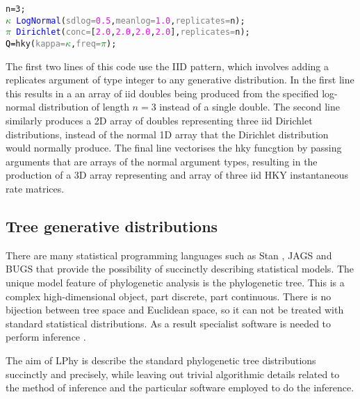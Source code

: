 \documentclass[10pt,letterpaper,table]{article}
\begin{document}
{\singlespacing
\begin{alltt}
  n = 3;
  \textcolor{green}{\(\kappa\)} ~ \textcolor{blue}{LogNormal}(\textcolor{gray}{sdlog=}\textcolor{magenta}{0.5}, \textcolor{gray}{meanlog=}\textcolor{magenta}{1.0}, \textcolor{gray}{replicates=}n);
  \textcolor{green}{\(\pi\)} ~ \textcolor{blue}{Dirichlet}(\textcolor{gray}{conc=}[\textcolor{magenta}{2.0}, \textcolor{magenta}{2.0}, \textcolor{magenta}{2.0}, \textcolor{magenta}{2.0}], \textcolor{gray}{replicates=}n);
  \textcolor{black}{Q = }\textcolor{magenta!80!black}{hky}(\textcolor{gray}{kappa=}\textcolor{green}{\(\kappa\)}, \textcolor{gray}{freq=}\textcolor{green}{\(\pi\)});

\end{alltt} 

The first two lines of this code use the IID pattern, which involves adding a replicates argument of type integer to any generative distribution. In the first line this results in a an array of iid doubles being produced from the specified log-normal distribution of length $n = 3$ instead of a single double. The second line similarly produces a 2D array of doubles representing three iid Dirichlet distributions, instead of the normal 1D array that the Dirichlet distribution would normally produce. The final line vectorises the hky funcgtion by passing arguments that are arrays of the normal argument types, resulting in the production of a 3D array representing and array of three iid HKY instantaneous rate matrices.

\subsection*{Tree generative distributions}

There are many statistical programming languages such as Stan
\cite{carpenter2017stan}, JAGS \cite{plummer2003jags} and BUGS \cite{lunn2009bugs, gilks1994language} that provide the possibility
of succinctly describing statistical models. The unique model feature of
phylogenetic analysis is the phylogenetic tree.
This is a complex high-dimensional object, part discrete, part
continuous.
There is no bijection between tree space and Euclidean space, so it
can not be treated with standard statistical distributions.
As a result specialist software is needed to perform inference \cite{hohna2016revbayes,bouckaert2019beastanalysis}.

The aim of LPhy is describe the standard phylogenetic tree
distributions succinctly and precisely, while leaving out trivial algorithmic details related to the method
of inference and the particular software employed to do the inference.

}
\end{document}
